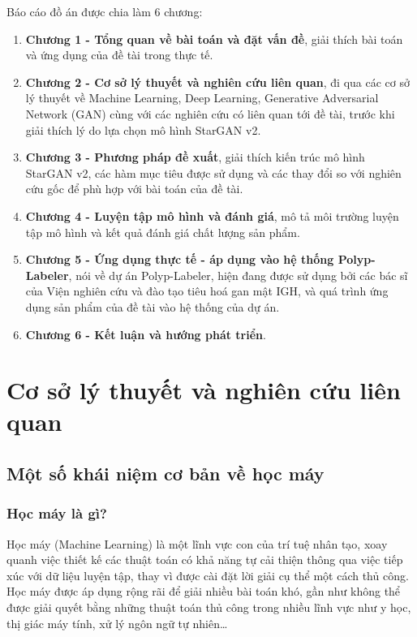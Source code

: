 \documentclass[12pt]{extreport}
\begin{document}
Báo cáo đồ án được chia làm 6 chương:
\begin{enumerate}
    \item \textbf{Chương 1 - Tổng quan về bài toán và đặt vấn đề}, giải thích bài toán và ứng dụng của đề tài trong thực tế.
    \item \textbf{Chương 2 - Cơ sở lý thuyết và nghiên cứu liên quan}, đi qua các cơ sở lý thuyết về Machine Learning, Deep Learning, Generative Adversarial Network (GAN) cùng với các nghiên cứu có liên quan tới đề tài, trước khi giải thích lý do lựa chọn mô hình StarGAN v2.
    \item \textbf{Chương 3 - Phương pháp đề xuất}, giải thích kiến trúc mô hình StarGAN v2, các hàm mục tiêu được sử dụng và các thay đổi so với nghiên cứu gốc để phù hợp với bài toán của đề tài.
    \item \textbf{Chương 4 - Luyện tập mô hình và đánh giá}, mô tả môi trường luyện tập mô hình và kết quả đánh giá chất lượng sản phẩm.
    \item \textbf{Chương 5 - Ứng dụng thực tế - áp dụng vào hệ thống Polyp-Labeler}, nói về dự án Polyp-Labeler, hiện đang được sử dụng bởi các bác sĩ của Viện nghiên cứu và đào tạo tiêu hoá gan mật IGH, và quá trình ứng dụng sản phẩm của đề tài vào hệ thống của dự án.
    \item \textbf{Chương 6 - Kết luận và hướng phát triển}.
\end{enumerate}

\chapter{Cơ sở lý thuyết và nghiên cứu liên quan}

\section{Một số khái niệm cơ bản về học máy}

\subsection{Học máy là gì?}

Học máy (Machine Learning) là một lĩnh vực con của trí tuệ nhân tạo, xoay quanh việc thiết kế các thuật toán có khả năng tự cải thiện thông qua việc tiếp xúc với dữ liệu luyện tập, thay vì được cài đặt lời giải cụ thể một cách thủ công. Học máy được áp dụng rộng rãi để giải nhiều bài toán khó, gần như không thể được giải quyết bằng những thuật toán thủ công trong nhiều lĩnh vực như y học, thị giác máy tính, xử lý ngôn ngữ tự nhiên\dots
\end{document}
